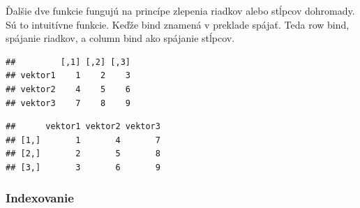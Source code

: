 Ďalšie dve funkcie fungujú na princípe zlepenia riadkov alebo stĺpcov
dohromady. Sú to intuitívne funkcie. Keďže bind znamená v preklade
spájať. Teda row bind, spájanie riadkov, a column bind ako spájanie
stĺpcov.

\begin{Shaded}
\begin{Highlighting}[]

\StringTok{ }\NormalTok{(}\OperatorTok{:}\NormalTok{)}
\StringTok{ }\NormalTok{(}\NormalTok{, }\NormalTok{, }\NormalTok{)}
\StringTok{ }\NormalTok{(}\NormalTok{, }\NormalTok{, }\NormalTok{)}


\StringTok{ }

\end{Highlighting}
\end{Shaded}

\begin{verbatim}
##         [,1] [,2] [,3]
## vektor1    1    2    3
## vektor2    4    5    6
## vektor3    7    8    9
\end{verbatim}

\begin{Shaded}
\begin{Highlighting}[]
\StringTok{ }

\end{Highlighting}
\end{Shaded}

\begin{verbatim}
##      vektor1 vektor2 vektor3
## [1,]       1       4       7
## [2,]       2       5       8
## [3,]       3       6       9
\end{verbatim}

\hypertarget{indexovanie-1}{%
\subsubsection{Indexovanie}\label{indexovanie-1}}

